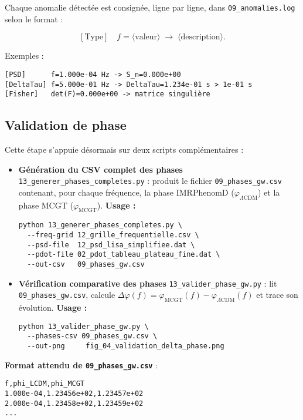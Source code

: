 Chaque anomalie détectée est consignée, ligne par ligne, dans \texttt{09\_anomalies.log} selon le format :

\[
  [\text{Type}]\quad f=\langle\text{valeur}\rangle\;\to\;\langle\text{description}\rangle.
\]

\noindent Exemples :
\begin{verbatim}
[PSD]      f=1.000e-04 Hz -> S_n=0.000e+00
[DeltaTau] f=5.000e-01 Hz -> DeltaTau=1.234e-01 s > 1e-01 s
[Fisher]   det(F)=0.000e+00 -> matrice singulière
\end{verbatim}

\subsection{Validation de phase}\label{subsec:valider_phase}

Cette étape s’appuie désormais sur deux scripts complémentaires :

\begin{itemize}
  \item \textbf{Génération du CSV complet des phases}
    \texttt{13\_generer\_phases\_completes.py} : produit le fichier
    \texttt{09\_phases\_gw.csv} contenant, pour chaque fréquence, la phase
    IMRPhenomD (\(\varphi_{\Lambda\mathrm{CDM}}\)) et la phase MCGT
    (\(\varphi_{\mathrm{MCGT}}\)).
    \textbf{Usage :}
    \begin{verbatim}
python 13_generer_phases_completes.py \
  --freq-grid 12_grille_frequentielle.csv \
  --psd-file  12_psd_lisa_simplifiee.dat \
  --pdot-file 02_pdot_tableau_plateau_fine.dat \
  --out-csv   09_phases_gw.csv
    \end{verbatim}

  \item \textbf{Vérification comparative des phases}
    \texttt{13\_valider\_phase\_gw.py} : lit \texttt{09\_phases\_gw.csv}, calcule
    \(\Delta\varphi(f)=\varphi_{\mathrm{MCGT}}(f)-\varphi_{\Lambda\mathrm{CDM}}(f)\)
    et trace son évolution.
    \textbf{Usage :}
    \begin{verbatim}
python 13_valider_phase_gw.py \
  --phases-csv 09_phases_gw.csv \
  --out-png     fig_04_validation_delta_phase.png
    \end{verbatim}
\end{itemize}

\medskip
\noindent\textbf{Format attendu de \texttt{09\_phases\_gw.csv}} :

\begin{verbatim}
f,phi_LCDM,phi_MCGT
1.000e-04,1.23456e+02,1.23457e+02
2.000e-04,1.23458e+02,1.23459e+02
...
\end{verbatim}

